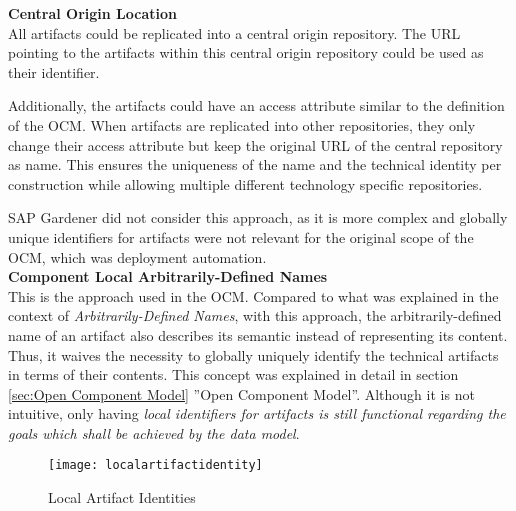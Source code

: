 \noindent\textbf{Central Origin Location}\\
All artifacts could be replicated into a central origin repository. The URL pointing to the artifacts within this central origin repository could be used as their identifier.\par
Additionally, the artifacts could have an access attribute similar to the definition of the OCM. When artifacts are replicated into other repositories, they only change their access attribute but keep the original URL of the central repository as name. This ensures the uniqueness of the name and the technical identity per construction while allowing multiple different technology specific repositories.\par
SAP Gardener did not consider this approach, as it is more complex and globally unique identifiers for artifacts were not relevant for the original scope of the OCM, which was deployment automation.\\

\noindent\textbf{Component Local Arbitrarily-Defined Names}\\
This is the approach used in the OCM. Compared to what was explained in the context of \emph{Arbitrarily-Defined Names}, with this approach, the arbitrarily-defined name of an artifact also describes its semantic instead of representing its content. Thus, it waives the necessity to globally uniquely identify the technical artifacts in terms of their contents. This concept was explained in detail in section \ref{sec:Open Component Model} ''Open Component Model''. Although it is not intuitive, only having \emph{local identifiers for artifacts is still functional regarding the goals which shall be achieved by the data model}.

\begin{figure}[H]
	\centering
	\texttt{[image: localartifactidentity]}
	\caption[Local Artifact Identities]{Local Artifact Identities }
	\label{fig:LocalArtifactIdentity}
\end{figure}

